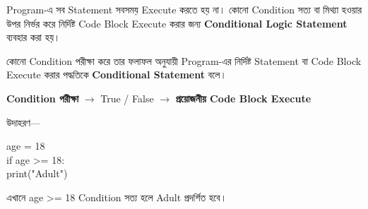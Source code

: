 
Program-এ সব Statement সবসময় Execute করতে হয় না।
কোনো Condition সত্য বা মিথ্যা হওয়ার উপর নির্ভর করে
নির্দিষ্ট Code Block Execute করার জন্য
\textbf{Conditional Logic Statement} ব্যবহার করা হয়।



\begin{definitionbox}

কোনো Condition পরীক্ষা করে তার ফলাফল অনুযায়ী Program-এর
নির্দিষ্ট Statement বা Code Block Execute করার পদ্ধতিকে
\textbf{Conditional Statement} বলে।

\end{definitionbox}

\begin{center}

\textbf{Condition পরীক্ষা}
\(\longrightarrow\)
\textenglish{\ttfamily True / False}
\(\longrightarrow\)
\textbf{প্রয়োজনীয় Code Block Execute}

\end{center}

উদাহরণ—

\begin{codebox}
\begin{english}
\ttfamily
age = 18\\
if age >= 18:\\
\hspace*{4mm}print("Adult")
\end{english}
\end{codebox}

এখানে
\textenglish{\ttfamily age >= 18}
Condition সত্য হলে
\textenglish{\ttfamily Adult}
প্রদর্শিত হবে।



